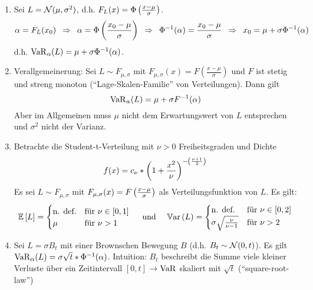 \begin{*beispiel}
	\begin{enumerate}[leftmargin=*]
		\item Sei $L = \Normal(\mu, \sigma^2)$, d.h. $F_L(x) = \Phi\brackets{\frac{x-\mu}{\sigma}}$. 
		\begin{equation*}
			\alpha = F_L(x_0) \follows \alpha = \Phi\brackets{\frac{x_0 - \mu}{\sigma}} \follows\Phi^{-1}(\alpha) = \frac{x_0 - \mu}{\sigma} \follows x_0 = \mu + \sigma \Phi^{-1}(\alpha)
		\end{equation*}
		d.h. $\VaR_\alpha(L) = \mu + \sigma \Phi^{-1}(\alpha)$.
		\item Verallgemeinerung: Sei $L \sim F_{\mu, \sigma}$ mit $F_{\mu, \sigma}(x) = F(\frac{x-\mu}{\sigma})$ und $F$ ist stetig und streng monoton
		(\enquote{Lage-Skalen-Familie} von Verteilungen). Dann gilt
		\begin{equation*}
			\VaR_\alpha(L) = \mu + \sigma F^{-1}(\alpha)
		\end{equation*}
		Aber im Allgemeinen muss $\mu$ nicht dem Erwartungswert von $L$ entsprechen und $\sigma^2$ nicht der Varianz.
		\item Betrachte die Student-t-Verteilung mit $\nu > 0$ Freiheitsgraden und Dichte
		\begin{equation*}
			f(x) = c_\nu * \brackets{1 + \frac{x^2}{\nu}}^{-\brackets{\frac{\nu+1}{2}}}
		\end{equation*}
		Es sei $L \sim F_{\mu, \sigma}$ mit $F_{\mu, \sigma}(x) = F\brackets{\frac{x-\mu}{\sigma}}$ als Verteilungsfunktion von $L$.
		Es gilt: 
		\begin{equation*}
			\EW[L] = \begin{cases}
			\text{n. def.} & \text{für } \nu \in [0,1] \\ \mu &\text{für } \nu > 1
			\end{cases} \quad \und \quad
			\Var[L] = \begin{cases}
			\text{n. def.} & \text{für } \nu \in [0,2] \\ \sigma \sqrt{\frac{\nu}{\nu-1}} &\text{für } \nu > 2
			\end{cases}
		\end{equation*}
		\item Sei $L = \sigma B_t$ mit einer Brownschen Bewegung $B$ (d.h. $B_t \sim \Normal(0,t)$). Es gilt $\VaR_\alpha(L) = \sigma \sqrt{t} * \Phi^{-1}(\alpha)$.
		Intuition: $B_t$ beschreibt die Summe viele kleiner Verluste über ein Zeitintervall $[0,t]$ $\to \VaR$ skaliert mit $\sqrt{t}$ (\enquote{square-root-law})
	\end{enumerate}
\end{*beispiel}

